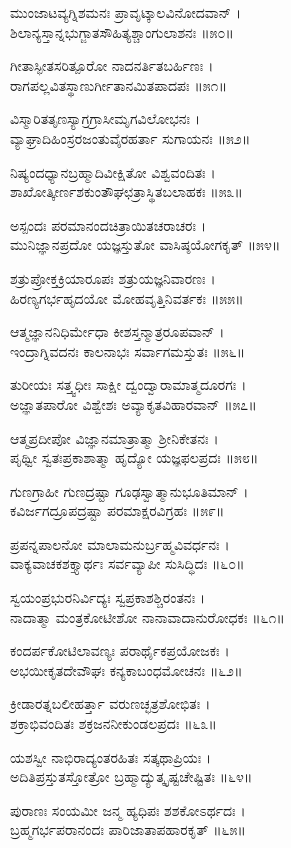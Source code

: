 ಮುಂಜಾಟವ್ಯಗ್ನಿಶಮನಃ ಪ್ರಾವೃಟ್ಕಾಲವಿನೋದವಾನ್ ।\\
ಶಿಲಾನ್ಯಸ್ತಾನ್ನಭುಗ್ಜಾತಸೌಹಿತ್ಯಶ್ಚಾಂಗುಲಾಶನಃ ॥೫೦॥

ಗೀತಾಸ್ಫೀತಸರಿತ್ಪೂರೋ ನಾದನರ್ತಿತಬರ್ಹಿಣಃ ।\\
ರಾಗಪಲ್ಲವಿತಸ್ಥಾಣುರ್ಗೀತಾನಮಿತಪಾದಪಃ ॥೫೧॥

ವಿಸ್ಮಾರಿತತೃಣಸ್ಯಾಗ್ರಗ್ರಾಸೀಮೃಗವಿಲೋಭನಃ ।\\
ವ್ಯಾಘ್ರಾದಿಹಿಂಸ್ರರಜಂತುವೈರಹರ್ತಾ ಸುಗಾಯನಃ ॥೫೨॥

ನಿಷ್ಯಂದಧ್ಯಾನಬ್ರಹ್ಮಾದಿವೀಕ್ಷಿತೋ ವಿಶ್ವವಂದಿತಃ ।\\
ಶಾಖೋತ್ಕೀರ್ಣಶಕುಂತೌಘಛತ್ರಾಸ್ಥಿತಬಲಾಹಕಃ ॥೫೩॥

ಅಸ್ಪಂದಃ ಪರಮಾನಂದಚಿತ್ರಾಯಿತಚರಾಚರಃ ।\\
ಮುನಿಜ್ಞಾನಪ್ರದೋ ಯಜ್ಞಸ್ತುತೋ ವಾಸಿಷ್ಠಯೋಗಕೃತ್ ॥೫೪॥

ಶತ್ರುಪ್ರೋಕ್ತಕ್ರಿಯಾರೂಪಃ ಶತ್ರುಯಜ್ಞನಿವಾರಣಃ ।\\
ಹಿರಣ್ಯಗರ್ಭಹೃದಯೋ ಮೋಹವೃತ್ತಿನಿವರ್ತಕಃ ॥೫೫॥

ಆತ್ಮಜ್ಞಾನನಿಧಿರ್ಮೇಧಾ ಕೀಶಸ್ತನ್ಮಾತ್ರರೂಪವಾನ್ ।\\
ಇಂದ್ರಾಗ್ನಿವದನಃ ಕಾಲನಾಭಃ ಸರ್ವಾಗಮಸ್ತುತಃ ॥೫೬॥

ತುರೀಯಃ ಸತ್ತ್ವಧೀಃ ಸಾಕ್ಷೀ ದ್ವಂದ್ವಾರಾಮಾತ್ಮದೂರಗಃ ।\\
ಅಜ್ಞಾತಪಾರೋ ವಿಶ್ವೇಶಃ ಅವ್ಯಾಕೃತವಿಹಾರವಾನ್ ॥೫೭॥

ಆತ್ಮಪ್ರದೀಪೋ ವಿಜ್ಞಾನಮಾತ್ರಾತ್ಮಾ ಶ್ರೀನಿಕೇತನಃ ।\\
ಪೃಥ್ವೀ ಸ್ವತಃಪ್ರಕಾಶಾತ್ಮಾ ಹೃದ್ಯೋ ಯಜ್ಞಫಲಪ್ರದಃ ॥೫೮॥

ಗುಣಗ್ರಾಹೀ ಗುಣದ್ರಷ್ಟಾ ಗೂಢಸ್ವಾತ್ಮಾನುಭೂತಿಮಾನ್ ।\\
ಕವಿರ್ಜಗದ್ರೂಪದ್ರಷ್ಟಾ ಪರಮಾಕ್ಷರವಿಗ್ರಹಃ ॥೫೯॥

ಪ್ರಪನ್ನಪಾಲನೋ ಮಾಲಾಮನುರ್ಬ್ರಹ್ಮವಿವರ್ಧನಃ ।\\
ವಾಕ್ಯವಾಚಕಶಕ್ತ್ಯಾರ್ಥಃ ಸರ್ವವ್ಯಾಪೀ ಸುಸಿದ್ಧಿದಃ ॥೬೦॥

ಸ್ವಯಂಪ್ರಭುರನಿರ್ವಿದ್ಯಃ ಸ್ವಪ್ರಕಾಶಶ್ಚಿರಂತನಃ ।\\
ನಾದಾತ್ಮಾ ಮಂತ್ರಕೋಟೀಶೋ ನಾನಾವಾದಾನುರೋಧಕಃ ॥೬೧॥

ಕಂದರ್ಪಕೋಟಿಲಾವಣ್ಯಃ ಪರಾರ್ಥೈಕಪ್ರಯೋಜಕಃ ।\\
ಅಭಯೀಕೃತದೇವೌಘಃ ಕನ್ಯಕಾಬಂಧಮೋಚನಃ ॥೬೨॥

ಕ್ರೀಡಾರತ್ನಬಲೀಹರ್ತ್ತಾ ವರುಣಚ್ಛತ್ರಶೋಭಿತಃ ।\\
ಶಕ್ರಾಭಿವಂದಿತಃ ಶಕ್ರಜನನೀಕುಂಡಲಪ್ರದಃ ॥೬೩॥

ಯಶಸ್ವೀ ನಾಭಿರಾದ್ಯಂತರಹಿತಃ ಸತ್ಕಥಾಪ್ರಿಯಃ ।\\
ಅದಿತಿಪ್ರಸ್ತುತಸ್ತೋತ್ರೋ ಬ್ರಹ್ಮಾದ್ಯುತ್ಕೃಷ್ಟಚೇಷ್ಟಿತಃ ॥೬೪॥

ಪುರಾಣಃ ಸಂಯಮೀ ಜನ್ಮ ಹ್ಯಧಿಪಃ ಶಶಕೋಽರ್ಥದಃ ।\\
ಬ್ರಹ್ಮಗರ್ಭಪರಾನಂದಃ ಪಾರಿಜಾತಾಪಹಾರಕೃತ್ ॥೬೫॥

